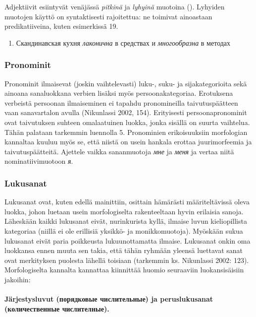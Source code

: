 \documentclass[]{scrartcl}
\begin{document}
Adjektiivit esiintyvät venäjässä \emph{pitkinä} ja \emph{lyhyinä}
muotoina (). Lyhyiden muotojen käyttö on syntaktisesti rajoitettua: ne
toimivat ainoastaan predikatiiveina, kuten esimerkissä 19.

\begin{enumerate}
\def\labelenumi{(\arabic{enumi})}
\setcounter{enumi}{18}
\itemsep1pt\parskip0pt
\item
  Скандинавская кухня \emph{лаконична} в средствах и \emph{многообразна}
  в методах
\end{enumerate}

\subsubsection{Pronominit}\label{pronominit}

Pronominit ilmaisevat (joskin vaihtelevasti) luku-, suku- ja
sijakategorioita sekä ainoana sanaluokkana verbien lisäksi myös
persoonakategoriaa. Erotuksena verbeistä persoonan ilmaiseminen ei
tapahdu pronomineilla taivutuspäätteen vaan sanavartalon avulla
(Nikunlassi 2002, 154). Erityisesti persoonapronominit ovat taivutuksen
suhteen omalaatuinen luokka, jonka sisällä on suurta vaihtelua. Tähän
palataan tarkemmin luennolla 5. Pronominien erikoisuuksiin morfologian
kannaltaa kuuluu myös se, että niistä on usein hankala erottaa
juurimorfeemia ja taivutuspäätteitä. Ajettele vaikka sananmuotoja
\emph{мне} ja \emph{меня} ja vertaa niitä nominatiivimuotoon \emph{я}.

\subsubsection{Lukusanat}\label{lukusanat}

Lukusanat ovat, kuten edellä mainittiin, osittain hämärästi
määriteltävissä oleva luokka, johon luetaan usein morfologiselta
rakenteeltaan hyvin erilaisia sanoja. Läheskään kaikki lukusanat eivät,
nurinkurista kyllä, ilmaise luvun kieliopillista kategoriaa (niillä ei
ole erillisiä yksikkö- ja monikkomuotoja). Myöskään sukua lukusanat
eivät paria poikkeusta lukuunottamatta ilmaise. Lukusanat onkin oma
luokkansa ennen muuta sen takia, että tähän ryhmään yleensä luettavat
sanat ovat merkityksen puolesta lähellä toisiaan (tarkemmin ks.
Nikunlassi 2002: 123). Morfologiselta kannalta kannattaa kiinnittää
huomio seuraaviin luokansisäisiin jakoihin:

\paragraph{Järjestysluvut (порядковые числительные) ja peruslukusanat
(количественные
числителные).}\label{juxe4rjestysluvut-ux43fux43eux440ux44fux434ux43aux43eux432ux44bux435-ux447ux438ux441ux43bux438ux442ux435ux43bux44cux43dux44bux435-ja-peruslukusanat-ux43aux43eux43bux438ux447ux435ux441ux442ux432ux435ux43dux43dux44bux435-ux447ux438ux441ux43bux438ux442ux435ux43bux43dux44bux435.}
\end{document}
